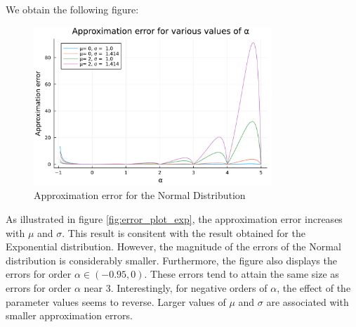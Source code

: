We obtain the following figure:
\begin{figure}[H]
    \centering
    \includegraphics[width=0.8\textwidth]{figures/error_plot_normal.pdf}
    \caption{Approximation error for the Normal Distribution}
    \label{fig:normal_plot_error}
\end{figure}
As illustrated in figure \ref{fig:error_plot_exp}, the approximation error increases with \(\mu\) and \(\sigma\). This result is consitent with the result obtained for the Exponential distribution. However, the magnitude of the errors of the Normal distribution is considerably smaller. Furthermore, the figure also displays the errors for order \(\alpha \in (-0.95, 0)\). These errors tend to attain the same size as errors for order \(\alpha\) near 3. Interestingly, for negative orders of \(\alpha\), the effect of the parameter values seems to reverse. Larger values of \(\mu\) and \(\sigma\) are associated with smaller approximation errors.
\newline 

